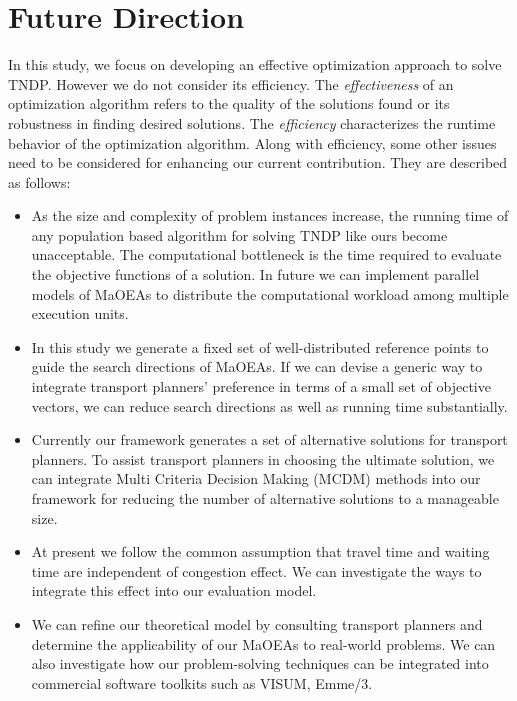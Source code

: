 \section{Future Direction}

In this study, we focus on developing an effective optimization approach to solve TNDP. However we do not consider its efficiency. The \textit{effectiveness} of an optimization algorithm refers to the quality of the solutions found or its robustness in finding desired solutions. The \textit{efficiency} characterizes the runtime behavior of the optimization algorithm. Along with efficiency, some other issues need to be considered for enhancing our current contribution. They are described as follows:

\begin{itemize}
	\item 	As the size and complexity of problem instances increase, the running time of any population based algorithm for solving TNDP like ours become unacceptable. The computational bottleneck is the time required to evaluate the objective functions of a solution. In future we can implement parallel models of MaOEAs to distribute the computational workload among multiple execution units.
	
	\item In this study we generate a fixed set of well-distributed reference points to guide the search directions of MaOEAs. If we can devise a generic way to integrate transport planners' preference in terms of a small set of objective vectors, we can reduce search directions as well as running time substantially. 
	 
	\item Currently our framework generates a set of alternative solutions for transport planners. To assist transport planners in choosing the ultimate solution, we can integrate Multi Criteria Decision Making (MCDM) methods into our framework for reducing the number of alternative solutions to a manageable size.
	
	\item At present we follow the common assumption that travel time and waiting time are independent of congestion effect. We can investigate the ways to integrate this effect into our evaluation model.
	
	\item We can refine our theoretical model by consulting transport planners and determine the applicability of our MaOEAs to real-world problems. We can also investigate how our problem-solving techniques can be integrated into commercial software toolkits such as VISUM, Emme/3.
\end{itemize}

